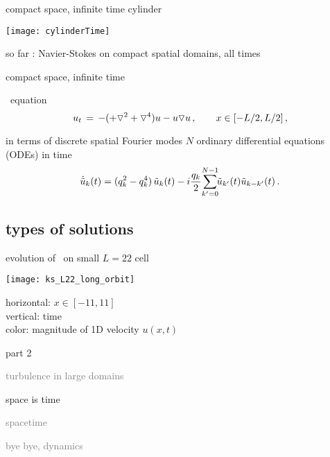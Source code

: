 \begin{frame}{compact space, infinite time cylinder}
\begin{center}
\texttt{[image: cylinderTime]}
\end{center}
so far : Navier-Stokes on compact spatial domains, all times
\end{frame}

\begin{frame}{compact space, infinite time} %
\begin{block}{\KS\ equation}
\[
  u_t \,=\,
    -({\color{red}+}\triangledown^2 +{\color{red}\triangledown^4}) u
    - u \triangledown u
    \,,\qquad   x \in [-L/2,L/2]
    \,,
\]
\end{block}

\bigskip

\begin{block}{in terms of discrete spatial Fourier modes}
$N$ ordinary differential equations (ODEs) in time
\[
\dot{\Fu}_k(\zeit) = ( q_k^2 - q_k^4 )\, \Fu_k(\zeit)
- i \frac{q_k}{2} \!\sum_{k'=0}^{N-1} \!\!\Fu_{k'}(\zeit) \Fu_{k-k'}(\zeit)
\,.
\]
\end{block}
\end{frame}


\subsection{types of solutions}
\begin{frame}{evolution of \KS\ on small $L=22$ cell}
\begin{center}
  \texttt{[image: ks\_L22\_long\_orbit]}
\end{center}
horizontal: $x \in [-11,11]$
\\
vertical: time
\\
color: magnitude of 1D velocity $u(x,t)$
\end{frame}

\begin{frame}{part 2}
\begin{enumerate}
              \item
    \textcolor{gray}{\small
turbulence in large domains
        }
              \item
    {\Large
space is time
    }\textcolor{gray}{\small
              \item
spacetime
              \item
bye bye, dynamics
                    }
            \end{enumerate}
\end{frame}

